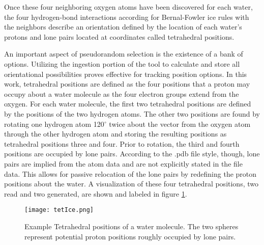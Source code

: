 Once these four neighboring oxygen atoms have been discovered for each water, the four hydrogen-bond interactions according for Bernal-Fowler ice rules with the neighbors describe an orientation defined by the location of each water's protons and lone pairs located at coordinates called tetrahedral positions.



An important aspect of pseudorandom selection is the existence of a bank of options.
Utilizing the ingestion portion of the tool to calculate and store all orientational possibilities proves effective for tracking position options.
In this work, tetrahedral positions are defined as the four positions that a proton may occupy about a water molecule as the four electron groups extend from the oxygen.
For each water molecule, the first two tetrahedral positions are defined by the positions of the two hydrogen atoms. 
The other two positions are found by rotating one hydrogen atom 120$^{\circ}$ twice about the vector from the oxygen atom through the other hydrogen atom and storing the resulting positions as tetrahedral positions three and four. 
Prior to rotation, the third and fourth positions are occupied by lone pairs.
According to the .pdb file style, though, lone pairs are implied from the atom data and are not explicitly stated in the file data.
This allows for passive relocation of the lone pairs by redefining the proton positions about the water.
A visualization of these four tetrahedral positions, two read and two generated, are shown and labeled in figure \ref{fig:tetXI}.

\begin{figure}
	
	\centering
	
	\texttt{[image: tetIce.png]}
	
	\caption{Example Tetrahedral positions of a water molecule. The two spheres represent potential proton positions roughly occupied by lone pairs.}
	
	\label{fig:tetXI}
	
\end{figure}


